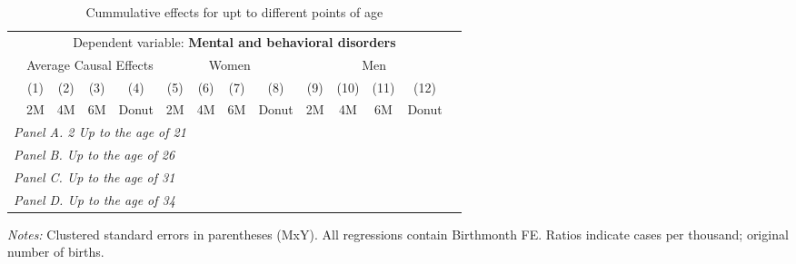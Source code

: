  \begin{table}[H] \begin{threeparttable} \centering \caption{Cummulative effects for upt to different points of age} {\def\sym#1{\ifmmode^{#1}\else\(^{#1}\)\fi} \begin{tabular}{l*{13}{c}} \toprule & \multicolumn{12}{c}{Dependent variable: \textbf{Mental and behavioral disorders}} \\ \cmidrule(lr){2-13}
            &\multicolumn{4}{c}{Average Causal Effects}         &\multicolumn{4}{c}{Women}                          &\multicolumn{4}{c}{Men}                            \\\cmidrule(lr){2-5}\cmidrule(lr){6-9}\cmidrule(lr){10-13}
            &\multicolumn{1}{c}{(1)}&\multicolumn{1}{c}{(2)}&\multicolumn{1}{c}{(3)}&\multicolumn{1}{c}{(4)}&\multicolumn{1}{c}{(5)}&\multicolumn{1}{c}{(6)}&\multicolumn{1}{c}{(7)}&\multicolumn{1}{c}{(8)}&\multicolumn{1}{c}{(9)}&\multicolumn{1}{c}{(10)}&\multicolumn{1}{c}{(11)}&\multicolumn{1}{c}{(12)}\\
            &\multicolumn{1}{c}{2M}&\multicolumn{1}{c}{4M}&\multicolumn{1}{c}{6M}&\multicolumn{1}{c}{Donut}&\multicolumn{1}{c}{2M}&\multicolumn{1}{c}{4M}&\multicolumn{1}{c}{6M}&\multicolumn{1}{c}{Donut}&\multicolumn{1}{c}{2M}&\multicolumn{1}{c}{4M}&\multicolumn{1}{c}{6M}&\multicolumn{1}{c}{Donut}\\
\midrule
 \multicolumn{13}{l}{\emph{Panel A. 2 Up to the age of 21}} \\   \midrule\multicolumn{13}{l}{\emph{Panel B. Up to the age of 26}} \\   \midrule\multicolumn{13}{l}{\emph{Panel C. Up to the age of 31}} \\   \midrule\multicolumn{13}{l}{\emph{Panel D. Up to the age of 34}} \\   
\bottomrule \end{tabular} } \begin{tablenotes} \item \scriptsize \emph{Notes:} Clustered standard errors in parentheses (MxY). All regressions contain Birthmonth FE. Ratios indicate cases per thousand; original number of births. \end{tablenotes} \end{threeparttable} \end{table} 
